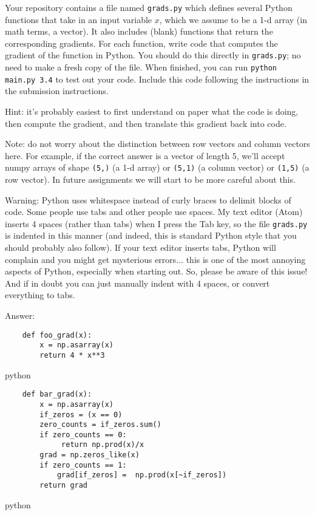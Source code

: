 \documentclass{article}
\newcommand{\blu}[1]{{\textcolor{blu}{#1}}}
\newenvironment{answer}{\par\begingroup\color{gre}Answer: }{\endgroup}
\let\ask\blu
\begin{document}
  Your repository contains a file named \texttt{grads.py} which defines several Python functions that take in an input variable $x$, which we assume to be a 1-d array (in math terms, a vector).
  It also includes (blank) functions that return the corresponding gradients.
  For each function, \ask{write code that computes the gradient of the function} in Python.
  You should do this directly in \texttt{grads.py}; no need to make a fresh copy of the file. When finished, you can run \texttt{python main.py 3.4} to test out your code. \ask{Include this code following the instructions in the submission instructions.}

  Hint: it's probably easiest to first understand on paper what the code is doing, then compute
  the gradient, and then translate this gradient back into code.

  Note: do not worry about the distinction between row vectors and column vectors here.
  For example, if the correct answer is a vector of length 5, we'll accept numpy arrays
  of shape \texttt{(5,)} (a 1-d array) or \texttt{(5,1)} (a column vector) or
  \texttt{(1,5)} (a row vector). In future assignments we will start to be more careful
  about this.

  Warning: Python uses whitespace instead of curly braces to delimit blocks of code.
  Some people use tabs and other people use spaces. My text editor (Atom) inserts 4 spaces (rather than tabs) when
  I press the Tab key, so the file \texttt{grads.py} is indented in this manner (and indeed, this is standard Python style that you should probably also follow). If your text editor inserts tabs,
  Python will complain and you might get mysterious errors... this is one of the most annoying aspects
  of Python, especially when starting out. So, please be aware of this issue! And if in doubt you can just manually
  indent with 4 spaces, or convert everything to tabs.
    \begin{answer}
        \begin{verbatim}
    def foo_grad(x):
        x = np.asarray(x)
        return 4 * x**3
        \end{verbatim}{python}
        \begin{verbatim}
    def bar_grad(x):
        x = np.asarray(x)
        if_zeros = (x == 0)
        zero_counts = if_zeros.sum()
        if zero_counts == 0:
             return np.prod(x)/x
        grad = np.zeros_like(x)
        if zero_counts == 1:
            grad[if_zeros] =  np.prod(x[~if_zeros])
        return grad
        \end{verbatim}{python}
    \end{answer}
\end{document}
